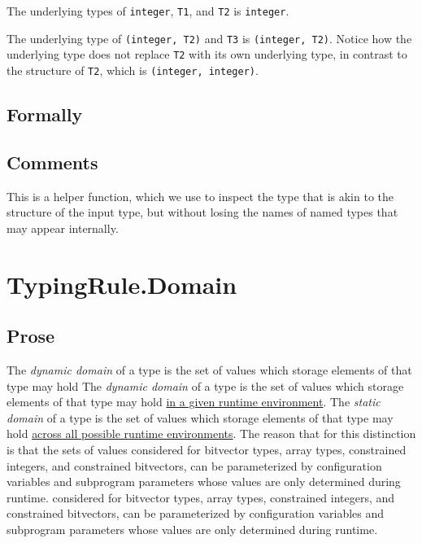 \documentclass{book}
\newcommand\makeanonymous[0]{\texttt{make\_anonymous}}
\newcommand\tty[0]{\texttt{ty}}
\newcommand\ta[0]{\texttt{ta}}
\begin{document}
The underlying types of \texttt{integer}, \texttt{T1}, and \texttt{T2} is \texttt{integer}.

The underlying type of \texttt{(integer, T2)} and \texttt{T3} is
\texttt{(integer, T2)}.  Notice how the underlying type does not replace
\texttt{T2} with its own underlying type, in contrast to the structure of
\texttt{T2}, which is \texttt{(integer, integer)}.



\begin{emptyformal}
  \subsection{Formally}
\end{emptyformal}
\subsection{Comments}
This is a helper function, which we use to inspect the type that is akin to the
structure of the input type, but without losing the names of named types that
may appear internally.

\section{TypingRule.Domain}

  \subsection{Prose}
  The \emph{dynamic domain} of a type is the set of values which storage elements of that type may hold
  The \emph{dynamic domain} of a type is the set of values which storage elements of that type may hold
  \underline{in a given runtime environment}.
  The \emph{static domain} of a type is the set of values which storage elements of that type may hold
  \underline{across all possible runtime environments}.
  The reason that for this distinction is that the sets of values
  considered for bitvector types, array types, constrained integers, and constrained bitvectors,
  can be parameterized by configuration variables and subprogram parameters whose values are only determined during runtime.
  considered for bitvector types, array types, constrained integers, and constrained bitvectors,
  can be parameterized by configuration variables and subprogram parameters whose values are only determined during runtime.
\end{document}

